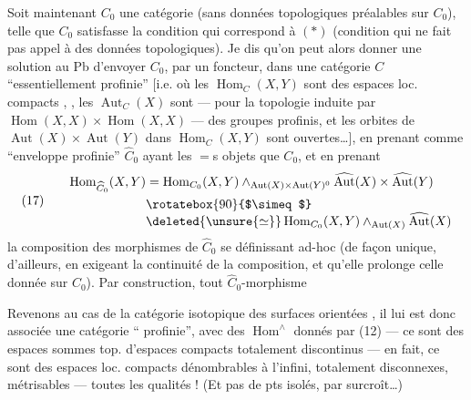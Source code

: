 Soit maintenant $C_0$ une catégorie (sans
données topologiques préalables sur $C_0$),
telle que $C_0$ satisfasse la condition
qui correspond à $(*)$ (condition qui ne
fait pas appel à des données topologiques).
Je dis qu'on peut alors donner une
solution au Pb d'envoyer $C_0$, par un foncteur,
dans une catégorie $C$ ``essentiellement profinie''
[i.e. où les $\operatorname{Hom}_C(X,Y)$ sont des espaces loc. compacts
, , les $\operatorname{Aut}_C(X)$ sont --- pour la topologie
induite par $\operatorname{Hom}(X,X)\times\operatorname{Hom}(X,X)$ --- des
groupes profinis, et les orbites de $\operatorname{Aut}(X)\times\operatorname{Aut}(Y)$
dans $\operatorname{Hom}_C(X,Y)$ sont ouvertes\ldots], en prenant
comme ``enveloppe profinie'' $\widehat C_0$  ayant les
$=$s  objets que $C_0$, et en prenant
\[
(17)\qquad\begin{aligned}
\operatorname{Hom}_{\widehat C_0}(X,Y)&=\operatorname{Hom}_{C_0}(X,Y)\mathbin{\wedge}_{\operatorname{Aut}(X)\times\operatorname{Aut}(Y)^0}\widehat{\operatorname{Aut}}(X)\times\widehat{\operatorname{Aut}}(Y)\\
&\rotatebox{90}{$\simeq$}\\[-1ex]
&\deleted{\unsure{\simeq}}\operatorname{Hom}_{C_0}(X,Y)\mathbin{\wedge}_{\operatorname{Aut}(X)}\widehat{\operatorname{Aut}}(X)
\end{aligned}
\]
la composition des morphismes de $\widehat C_0$ se
définissant ad-hoc (de façon unique, d'ailleurs,
en exigeant la continuité de la composition, et
qu'elle prolonge celle donnée sur $C_0$).
Par construction, tout $\widehat C_0$-morphisme

Revenons au cas de la catégorie isotopique
des surfaces orientées  , il lui est donc
associée une catégorie `` profinie'',
avec des $\operatorname{Hom}^{\wedge}$ donnés par (12) --- ce sont
des espaces sommes top. d'espaces compacts
totalement discontinus --- en fait, ce sont
des espaces loc. compacts dénombrables à l'infini,
totalement disconnexes, métrisables --- toutes
les qualités ! (Et pas de pts isolés, par
surcroît\ldots)


